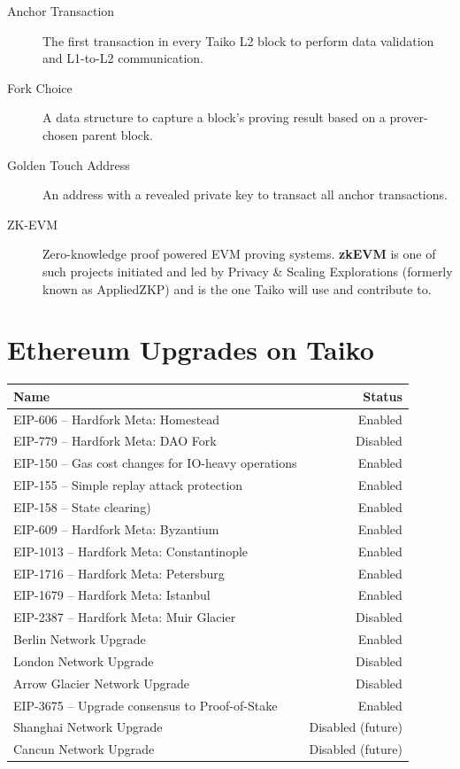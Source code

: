 \documentclass[9pt,oneside]{amsart}
\begin{document}
\begin{description}
\item[Anchor Transaction] The first transaction in every Taiko L2 block to perform data validation and L1-to-L2 communication.


\item[Fork Choice] A data structure to capture a block's proving result based on a prover-chosen parent block.

\item[Golden Touch Address] An address with a revealed private key to transact all anchor transactions.

\item[ZK-EVM] Zero-knowledge proof powered EVM proving systems. \textbf{zkEVM} is one of such projects initiated and led by 
Privacy \& Scaling Explorations (formerly known as AppliedZKP)\cite{pse} and is the one Taiko will use and contribute to.
\end{description}

\section{Ethereum Upgrades on Taiko}\label{sec:eips}

\begin{tabu}{l r }
\toprule
Name & Status \\
\midrule
EIP-606 -- Hardfork Meta: Homestead & \quad \quad \quad \quad \quad \quad \quad \quad \quad \quad \quad \quad \quad \quad \quad \quad \quad \quad \quad \quad \quad \quad  Enabled \\
EIP-779 -- Hardfork Meta: DAO Fork & Disabled \\
EIP-150 -- Gas cost changes for IO-heavy operations & Enabled \\
EIP-155 -- Simple replay attack protection &  Enabled \\
EIP-158 -- State clearing) & Enabled \\
EIP-609 -- Hardfork Meta: Byzantium & Enabled \\
EIP-1013 -- Hardfork Meta: Constantinople & Enabled \\
EIP-1716 -- Hardfork Meta: Petersburg & Enabled \\
EIP-1679 -- Hardfork Meta: Istanbul & Enabled \\
EIP-2387 -- Hardfork Meta: Muir Glacier & Disabled \\
Berlin Network Upgrade & Enabled \\
London Network Upgrade & Disabled \\
Arrow Glacier Network Upgrade & Disabled \\
EIP-3675 -- Upgrade consensus to Proof-of-Stake & Enabled \\
Shanghai Network Upgrade & Disabled (future) \\
Cancun Network Upgrade & Disabled (future)  \\
\bottomrule
\end{tabu}
\end{document}
